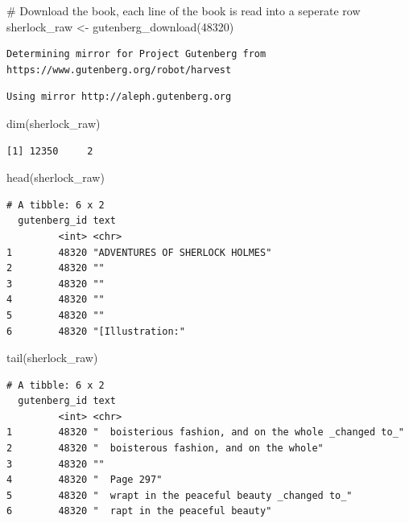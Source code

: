 \documentclass[
  letterpaper,
  DIV=11,
  numbers=noendperiod]{scrreprt}
\newenvironment{Shaded}{\begin{snugshade}}{\end{snugshade}}
\newcommand{\CommentTok}[1]{\textcolor[rgb]{0.37,0.37,0.37}{#1}}
\newcommand{\DecValTok}[1]{\textcolor[rgb]{0.68,0.00,0.00}{#1}}
\newcommand{\FunctionTok}[1]{\textcolor[rgb]{0.28,0.35,0.67}{#1}}
\newcommand{\NormalTok}[1]{\textcolor[rgb]{0.00,0.23,0.31}{#1}}
\newcommand{\OtherTok}[1]{\textcolor[rgb]{0.00,0.23,0.31}{#1}}
\begin{document}
\begin{Shaded}
\begin{Highlighting}[]
\CommentTok{\# Download the book, each line of the book is read into a seperate row}
\NormalTok{sherlock\_raw }\OtherTok{\textless{}{-}} \FunctionTok{gutenberg\_download}\NormalTok{(}\DecValTok{48320}\NormalTok{)}
\end{Highlighting}
\end{Shaded}

\begin{verbatim}
Determining mirror for Project Gutenberg from https://www.gutenberg.org/robot/harvest
\end{verbatim}

\begin{verbatim}
Using mirror http://aleph.gutenberg.org
\end{verbatim}

\begin{Shaded}
\begin{Highlighting}[]
\FunctionTok{dim}\NormalTok{(sherlock\_raw)}
\end{Highlighting}
\end{Shaded}

\begin{verbatim}
[1] 12350     2
\end{verbatim}

\begin{Shaded}
\begin{Highlighting}[]
\FunctionTok{head}\NormalTok{(sherlock\_raw)}
\end{Highlighting}
\end{Shaded}

\begin{verbatim}
# A tibble: 6 x 2
  gutenberg_id text                           
         <int> <chr>                          
1        48320 "ADVENTURES OF SHERLOCK HOLMES"
2        48320 ""                             
3        48320 ""                             
4        48320 ""                             
5        48320 ""                             
6        48320 "[Illustration:"               
\end{verbatim}

\begin{Shaded}
\begin{Highlighting}[]
\FunctionTok{tail}\NormalTok{(sherlock\_raw)}
\end{Highlighting}
\end{Shaded}

\begin{verbatim}
# A tibble: 6 x 2
  gutenberg_id text                                                  
         <int> <chr>                                                 
1        48320 "  boisterious fashion, and on the whole _changed to_"
2        48320 "  boisterous fashion, and on the whole"              
3        48320 ""                                                    
4        48320 "  Page 297"                                          
5        48320 "  wrapt in the peaceful beauty _changed to_"         
6        48320 "  rapt in the peaceful beauty"                       
\end{verbatim}
\end{document}
